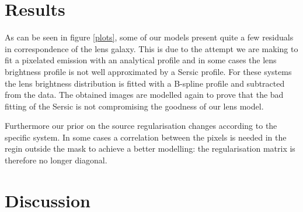 \documentclass[a4paper,fleqn,usenatbib]{mnras}
\begin{document}
\section{Results}
As can be seen in figure \ref{plots}, some of our models present quite a few residuals in correspondence of the lens galaxy. This is due to the attempt we are making to fit a pixelated emission with an analytical profile and in some cases the lens brightness profile is not well approximated by a Sersic profile. For these systems the lens brightness distribution is fitted with a B-spline profile and subtracted from the data. The obtained images are modelled again to prove that the bad fitting of the Sersic is not compromising the goodness of our lens model.

Furthermore our prior on the source regularisation changes according to the specific system. In some cases a correlation between the pixels is needed in the regin outside the mask to achieve a better modelling: the regularisation matrix is therefore no longer diagonal.

\section{Discussion}

%
\end{document}
